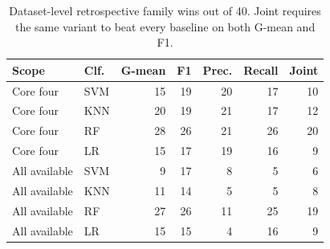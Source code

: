 \documentclass[conference]{IEEEtran}
\begin{document}
\begin{table}[!t]
\centering\small
\caption{Dataset-level retrospective family wins out of 40. Joint requires the same variant to beat every baseline on both G-mean and F1.}\label{tab:family}
\begin{tabular}{llrrrrr}\toprule
Scope & Clf. & G-mean & F1 & Prec. & Recall & Joint \\
\midrule
Core four & SVM & 15 & 19 & 20 & 17 & 10 \\
Core four & KNN & 20 & 19 & 21 & 17 & 12 \\
Core four & RF & 28 & 26 & 21 & 26 & 20 \\
Core four & LR & 15 & 17 & 19 & 16 & 9 \\
All available & SVM & 9 & 17 & 8 & 5 & 6 \\
All available & KNN & 11 & 14 & 5 & 5 & 8 \\
All available & RF & 27 & 26 & 11 & 25 & 19 \\
All available & LR & 15 & 15 & 4 & 16 & 9 \\
\bottomrule\end{tabular}
\end{table}
\end{document}
